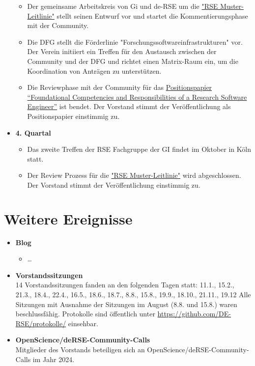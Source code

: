 \begin{itemize}
\begin{itemize}
    \item Der gemeinsame Arbeitskreis von Gi und de-RSE um die \href{https://doi.org/10.18420/2025-gi_de-rse}{"RSE Muster-Leitlinie"} stellt seinen Entwurf vor und startet die Kommentierungsphase mit der Community.
    \item Die DFG stellt die Förderlinie "Forschungssoftwareinfrastrukturen" vor. Der Verein initiiert ein Treffen für den Austausch zwischen der Community und der DFG und richtet einen Matrix-Raum ein, um die Koordination von Anträgen zu unterstützen.
    \item Die Reviewphase mit der Community für das  \href{https://doi.org/10.12688/f1000research.157778.2}{Positionspapier “Foundational Competencies and Responsibilities of a Research Software Engineer”} ist bendet. Der Vorstand stimmt der Veröffentlichung als Positionspapier einstimmig zu.

   \end{itemize}
 \item[] \textbf{4. Quartal}
   \begin{itemize}
    \item Das zweite Treffen der RSE Fachgruppe der GI findet im Oktober in Köln statt.
    \item Der Review Prozess für die \href{https://doi.org/10.18420/2025-gi_de-rse}{"RSE Muster-Leitlinie"} wird abgeschlossen. Der Vorstand stimmt der Veröffentlichung einstimmig zu.
   \end{itemize}
\end{itemize}
\clearpage
\section{Weitere Ereignisse}

\begin{itemize}
 \item[] \textbf{Blog}
 \begin{itemize}
  \item \dots
 \end{itemize}
 \item[] \textbf{Vorstandssitzungen}\\
  14 Vorstandssitzungen fanden an den folgenden Tagen statt: 11.1., 15.2., 21.3., 18.4., 22.4., 16.5., 18.6., 18.7., 8.8., 15.8., 19.9., 18.10., 21.11., 19.12
  Alle Sitzungen mit Ausnahme der Sitzungen im August (8.8. und 15.8.) waren beschlussfähig.
  Protokolle sind öffentlich unter \href{https://github.com/DE-RSE/protokolle/}{https://github.com/DE-RSE/protokolle/} einsehbar.
 \item[] \textbf{OpenScience/deRSE-Community-Calls}\\
 Mitglieder des Vorstands beteiligen sich an  OpenScience/deRSE-Community-Calls im Jahr 2024.
\end{itemize}

